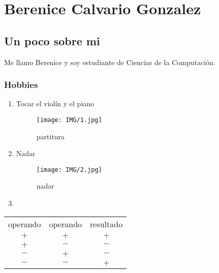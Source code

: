 
\chapter{Berenice Calvario Gonzalez}
\section{Un poco sobre mi}
Me llamo Berenice y soy estudiante de Ciencias de la Computación. 

\subsection{Hobbies}
\begin{enumerate}
\item Tocar el violín y el piano
  
  \begin{figure}[h]
    \centering
    \texttt{[image: IMG/1.jpg]}
    \caption{\small partitura} \label{fig:1}
  \end{figure}

  
      
\item Nadar

  \begin{figure}[h] 
    \centering
    \texttt{[image: IMG/2.jpg]}
    \caption{\small nadar} \label{fig:2}
  \end{figure}
  
\item
\end{enumerate}

\begin{table}[h]
  \centering
  \begin{tabular}{ c c c }
    \hline
    operando & operando & resultado\\
    $+$ & $+$ & $+$\\
    $+$ & $-$ & $-$\\
    $-$ & $+$ & $-$\\
    $-$ & $-$ & $+$\\
    \hline
  \end{tabular}
\end{table}
